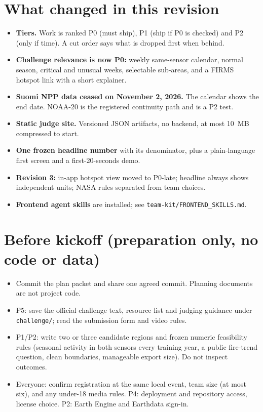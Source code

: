 \documentclass[10pt]{article}
\begin{document}
\section*{What changed in this revision}
\begin{itemize}
\item \textbf{Tiers.} Work is ranked P0 (must ship), P1 (ship if P0 is checked) and P2 (only if time). A cut order says what is dropped first when behind.
\item \textbf{Challenge relevance is now P0:} weekly same-sensor calendar, normal season, critical and unusual weeks, selectable sub-areas, and a FIRMS hotspot link with a short explainer.
\item \textbf{Suomi NPP data ceased on November 2, 2026.} The calendar shows the end date. NOAA-20 is the registered continuity path and is a P2 test.
\item \textbf{Static judge site.} Versioned JSON artifacts, no backend, at most 10~MB compressed to start.
\item \textbf{One frozen headline number} with its denominator, plus a plain-language first screen and a first-20-seconds demo.
\item \textbf{Revision 3:} in-app hotspot view moved to P0-late; headline always shows independent units; NASA rules separated from team choices.
\item \textbf{Frontend agent skills} are installed; see \texttt{team-kit/FRONTEND\_SKILLS.md}.
\end{itemize}

\section*{Before kickoff (preparation only, no code or data)}
\begin{itemize}
\item Commit the plan packet and share one agreed commit. Planning documents are not project code.
\item P5: save the official challenge text, resource list and judging guidance under \texttt{challenge/}; read the submission form and video rules.
\item P1/P2: write two or three candidate regions and frozen numeric feasibility rules (seasonal activity in both sensors every training year, a public fire-trend question, clean boundaries, manageable export size). Do not inspect outcomes.
\item Everyone: confirm registration at the same local event, team size (at most six), and any under-18 media rules. P4: deployment and repository access, license choice. P2: Earth Engine and Earthdata sign-in.
\end{itemize}
\end{document}
